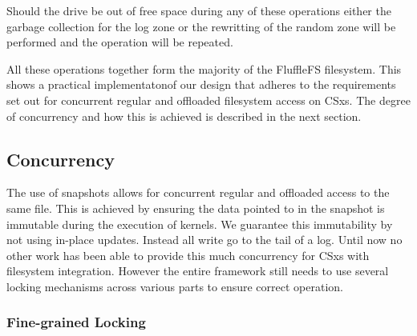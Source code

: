 Should the drive be out of free space during any of these operations either the
garbage collection for the log zone or the rewritting of the random zone will
be performed and the operation will be repeated.

All these operations together form the majority of the FluffleFS filesystem.
This shows a practical implementaton\footnotemark[15] of our design that adheres
to the requirements set out for concurrent regular and offloaded filesystem
access on CSxs. The degree of concurrency and how this is achieved is described
in the next section.




\subsection{Concurrency}

The use of snapshots allows for concurrent regular and offloaded access to the
same file. This is achieved by ensuring the data pointed to in the snapshot
is immutable during the execution of kernels. We guarantee this immutability by
not using in-place updates. Instead all write go to the tail of a log. Until now
no other work has been able to provide this much concurrency for CSxs with
filesystem integration. However the entire framework still needs to use several
locking mechanisms across various parts to ensure correct operation.

\subsubsection{Fine-grained Locking}

